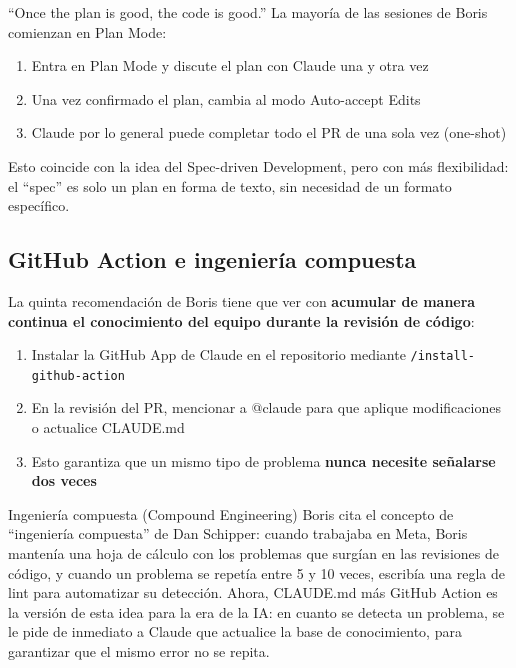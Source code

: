 \documentclass[a4paper]{article}
\begin{document}
\begin{importantbox}{``Once the plan is good, the code is good.''}
La mayoría de las sesiones de Boris comienzan en Plan Mode:
\begin{enumerate}
    \item Entra en Plan Mode y discute el plan con Claude una y otra vez
    \item Una vez confirmado el plan, cambia al modo Auto-accept Edits
    \item Claude por lo general puede completar todo el PR de una sola vez (one-shot)
\end{enumerate}
Esto coincide con la idea del Spec-driven Development, pero con más flexibilidad: el ``spec'' es solo un plan en forma de texto, sin necesidad de un formato específico.
\end{importantbox}

\subsection{GitHub Action e ingeniería compuesta}

La quinta recomendación de Boris tiene que ver con \textbf{acumular de manera continua el conocimiento del equipo durante la revisión de código}:

\begin{enumerate}
    \item Instalar la GitHub App de Claude en el repositorio mediante \texttt{/install-github-action}
    \item En la revisión del PR, mencionar a @claude para que aplique modificaciones o actualice CLAUDE.md
    \item Esto garantiza que un mismo tipo de problema \textbf{nunca necesite señalarse dos veces}
\end{enumerate}

\begin{knowledgebox}{Ingeniería compuesta (Compound Engineering)}
Boris cita el concepto de ``ingeniería compuesta'' de Dan Schipper: cuando trabajaba en Meta, Boris mantenía una hoja de cálculo con los problemas que surgían en las revisiones de código, y cuando un problema se repetía entre 5 y 10 veces, escribía una regla de lint para automatizar su detección. Ahora, CLAUDE.md más GitHub Action es la versión de esta idea para la era de la IA: en cuanto se detecta un problema, se le pide de inmediato a Claude que actualice la base de conocimiento, para garantizar que el mismo error no se repita.
\end{knowledgebox}
\end{document}
